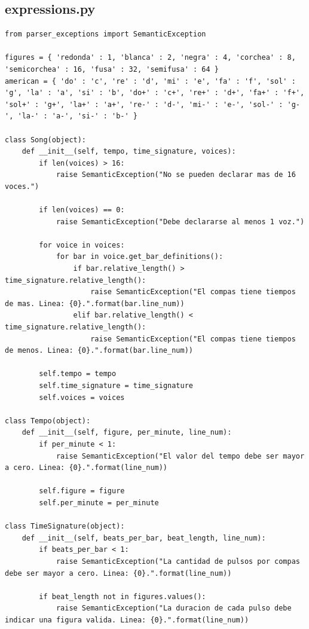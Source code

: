 \documentclass[a4paper, 10pt, twoside]{article}
\begin{document}
\subsection{expressions.py}
\begin{verbatim}
from parser_exceptions import SemanticException

figures = { 'redonda' : 1, 'blanca' : 2, 'negra' : 4, 'corchea' : 8, 'semicorchea' : 16, 'fusa' : 32, 'semifusa' : 64 }
american = { 'do' : 'c', 're' : 'd', 'mi' : 'e', 'fa' : 'f', 'sol' : 'g', 'la' : 'a', 'si' : 'b', 'do+' : 'c+', 're+' : 'd+', 'fa+' : 'f+', 'sol+' : 'g+', 'la+' : 'a+', 're-' : 'd-', 'mi-' : 'e-', 'sol-' : 'g-', 'la-' : 'a-', 'si-' : 'b-' }

class Song(object):
    def __init__(self, tempo, time_signature, voices):
        if len(voices) > 16:
            raise SemanticException("No se pueden declarar mas de 16 voces.")

        if len(voices) == 0:
            raise SemanticException("Debe declararse al menos 1 voz.")
        
        for voice in voices:
            for bar in voice.get_bar_definitions():
                if bar.relative_length() > time_signature.relative_length():
                    raise SemanticException("El compas tiene tiempos de mas. Linea: {0}.".format(bar.line_num))
                elif bar.relative_length() < time_signature.relative_length():
                    raise SemanticException("El compas tiene tiempos de menos. Linea: {0}.".format(bar.line_num))

        self.tempo = tempo
        self.time_signature = time_signature        
        self.voices = voices

class Tempo(object):
    def __init__(self, figure, per_minute, line_num):    
        if per_minute < 1:
            raise SemanticException("El valor del tempo debe ser mayor a cero. Linea: {0}.".format(line_num))
            
        self.figure = figure
        self.per_minute = per_minute

class TimeSignature(object):
    def __init__(self, beats_per_bar, beat_length, line_num):
        if beats_per_bar < 1:
            raise SemanticException("La cantidad de pulsos por compas debe ser mayor a cero. Linea: {0}.".format(line_num))

        if beat_length not in figures.values():
            raise SemanticException("La duracion de cada pulso debe indicar una figura valida. Linea: {0}.".format(line_num))


\end{verbatim}
\end{document}
